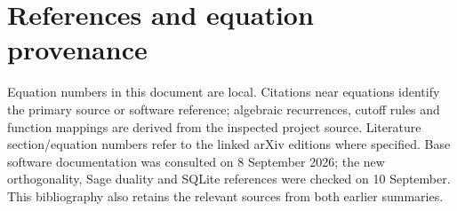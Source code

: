 \documentclass[11pt,a4paper]{article}
\numberwithin{equation}{section}
\begin{document}
\endgroup
\clearpage

\clearpage
\section*{References and equation provenance}
Equation numbers in this document are local. Citations near equations identify
the primary source or software reference; algebraic recurrences, cutoff rules
and function mappings are derived from the inspected project source. Literature
section/equation numbers refer to the linked arXiv editions where specified.
Base software documentation was consulted on 8 September 2026; the new
orthogonality, Sage duality and SQLite references were checked on 10 September. This bibliography
also retains the relevant sources from both earlier summaries.
\end{document}
